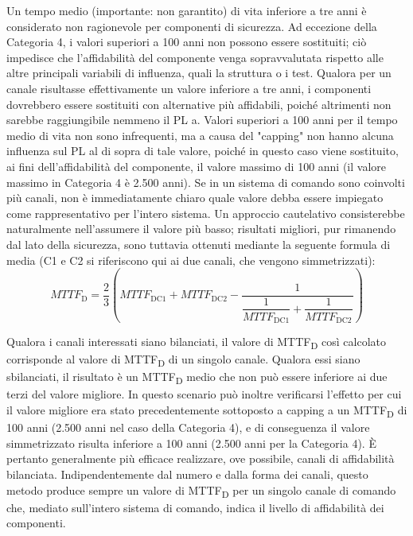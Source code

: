 Un tempo medio (importante: non garantito) di vita inferiore a tre anni è considerato non ragionevole per componenti di sicurezza. Ad eccezione della Categoria 4, i valori superiori a 100 anni non possono essere sostituiti; ciò impedisce che l'affidabilità del componente venga sopravvalutata rispetto alle altre principali variabili di influenza, quali la struttura o i test. Qualora per un canale risultasse effettivamente un valore inferiore a tre anni, i componenti dovrebbero essere sostituiti con alternative più affidabili, poiché altrimenti non sarebbe raggiungibile nemmeno il PL a. Valori superiori a 100 anni per il tempo medio di vita non sono infrequenti, ma a causa del "capping" non hanno alcuna influenza sul PL al di sopra di tale valore, poiché in questo caso viene sostituito, ai fini dell'affidabilità del componente, il valore massimo di 100 anni (il valore massimo in Categoria 4 è 2.500 anni).
Se in un sistema di comando sono coinvolti più canali, non è immediatamente chiaro quale valore debba essere impiegato come rappresentativo per l'intero sistema. Un approccio cautelativo consisterebbe naturalmente nell'assumere il valore più basso; risultati migliori, pur rimanendo dal lato della sicurezza, sono tuttavia ottenuti mediante la seguente formula di media (C1 e C2 si riferiscono qui ai due canali, che vengono simmetrizzati):
\begin{equation}
    \textit{MTTF}_{\mathrm{D}} = \frac{2}{3}
    \left( \textit{MTTF}_{\mathrm{DC1}} + \textit{MTTF}_{\mathrm{DC2}}
    - \frac{1}{\dfrac{1}{\textit{MTTF}_{\mathrm{DC1}}} + \dfrac{1}{\textit{MTTF}_{\mathrm{DC2}}}} \right)
    \label{eq:06-02}
\end{equation}

Qualora i canali interessati siano bilanciati, il valore di MTTF\textsubscript{D} così calcolato corrisponde al valore di MTTF\textsubscript{D} di un singolo canale. Qualora essi siano sbilanciati, il risultato è un MTTF\textsubscript{D} medio che non può essere inferiore ai due terzi del valore migliore. In questo scenario può inoltre verificarsi l'effetto per cui il valore migliore era stato precedentemente sottoposto a capping a un MTTF\textsubscript{D} di 100 anni (2.500 anni nel caso della Categoria 4), e di conseguenza il valore simmetrizzato risulta inferiore a 100 anni (2.500 anni per la Categoria 4). È pertanto generalmente più efficace realizzare, ove possibile, canali di affidabilità bilanciata. Indipendentemente dal numero e dalla forma dei canali, questo metodo produce sempre un valore di MTTF\textsubscript{D} per un singolo canale di comando che, mediato sull'intero sistema di comando, indica il livello di affidabilità dei componenti.

